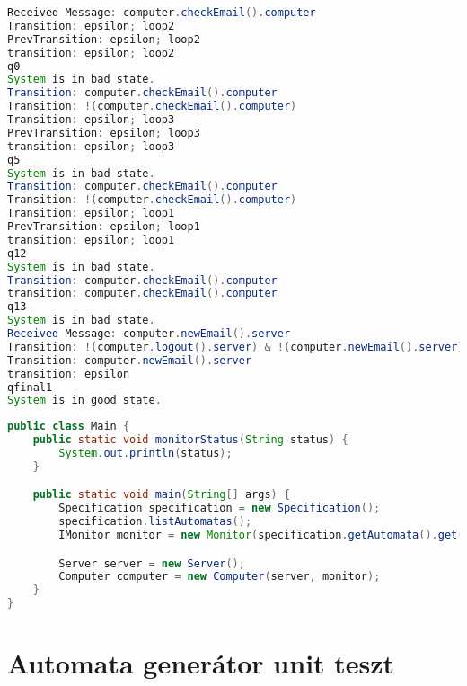\begin{lstlisting}[language=java, frame=single, float=ht!, caption={F.2.4. scenariohoz tartozó monitor kimenet.},captionpos=b]
Received Message: computer.checkEmail().computer
Transition: epsilon; loop2
PrevTransition: epsilon; loop2
transition: epsilon; loop2
q0
System is in bad state.
Transition: computer.checkEmail().computer
Transition: !(computer.checkEmail().computer)
Transition: epsilon; loop3
PrevTransition: epsilon; loop3
transition: epsilon; loop3
q5
System is in bad state.
Transition: computer.checkEmail().computer
Transition: !(computer.checkEmail().computer)
Transition: epsilon; loop1
PrevTransition: epsilon; loop1
transition: epsilon; loop1
q12
System is in bad state.
Transition: computer.checkEmail().computer
transition: computer.checkEmail().computer
q13
System is in bad state.
Received Message: computer.newEmail().server
Transition: !(computer.logout().server) & !(computer.newEmail().server)
Transition: computer.newEmail().server
transition: epsilon
qfinal1
System is in good state.
\end{lstlisting}

\begin{lstlisting}[language=java, frame=single, float=ht!, caption={F.2.4. scenariohoz tartozó Main osztály.},captionpos=b]
public class Main {
	public static void monitorStatus(String status) {
		System.out.println(status);
	}

	public static void main(String[] args) {
		Specification specification = new Specification();
		specification.listAutomatas();
		IMonitor monitor = new Monitor(specification.getAutomata().get(0));

		Server server = new Server();
		Computer computer = new Computer(server, monitor);
	}
}
\end{lstlisting}

\clearpage\section{Automata generátor unit teszt}

